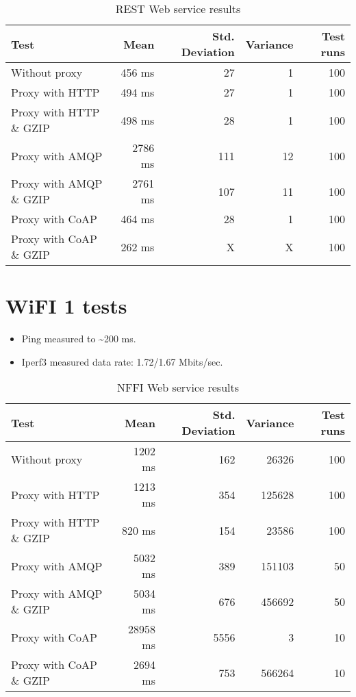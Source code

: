\begin{appendices}
\begin{table}[H]
\begin{tabular}{| l | r | r | r | r |}
\hline
  \textbf{Test} & \textbf{Mean} & \textbf{Std. Deviation} & \textbf{Variance} & \textbf{Test runs}\\ \hline
  Without proxy & 456 ms & 27 & 1 & 100 \\ \hline
  Proxy with HTTP & 494 ms & 27 & 1 & 100 \\ \hline
  Proxy with HTTP \& GZIP & 498 ms & 28 & 1 & 100 \\ \hline
  Proxy with AMQP & 2786 ms & 111 & 12 & 100 \\ \hline
  Proxy with AMQP \& GZIP & 2761 ms & 107 & 11 & 100\\ \hline
  Proxy with CoAP & 464 ms & 28 & 1 & 100 \\ \hline
  Proxy with CoAP \& GZIP & 262 ms & X & X & 100 \\ \hline
\end{tabular}
\caption{REST Web service results}
\end{table}




\section{WiFI 1 tests}

\begin{itemize}
	\item Ping measured to \textasciitilde 200 ms.
	\item Iperf3 measured data rate: 1.72/1.67 Mbits/sec.
\end{itemize}

\begin{table}[H]
\begin{tabular}{| l | r | r | r | r |}
\hline
  \textbf{Test} & \textbf{Mean} & \textbf{Std. Deviation} & \textbf{Variance} & \textbf{Test runs}\\ \hline
  Without proxy & 1202 ms & 162 & 26326 & 100 \\ \hline
  Proxy with HTTP & 1213 ms & 354 & 125628 & 100 \\ \hline
  Proxy with HTTP \& GZIP & 820 ms & 154 & 23586 & 100 \\ \hline
  Proxy with AMQP & 5032 ms & 389 & 151103 & 50 \\ \hline
  Proxy with AMQP \& GZIP & 5034 ms & 676 & 456692 & 50\\ \hline
  Proxy with CoAP & 28958 ms & 5556 & 3 & 10 \\ \hline
  Proxy with CoAP \& GZIP & 2694 ms & 753 & 566264 & 10 \\ \hline
\end{tabular}
\caption{NFFI Web service results}
\end{table}



\end{appendices}
